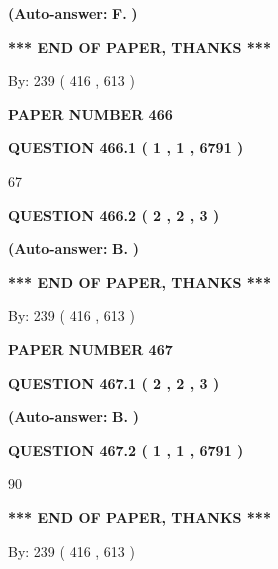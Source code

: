 \documentclass{ctexart}
\begin{document}
 
{\textbf{(Auto-answer:}}
{\textbf{\large{
F.}}}
{\textbf{)}}
 
 
   
   
   
   
\vspace{1.0in} 
{\textbf{\large{ *** END OF PAPER, THANKS *** }}} 
   
   
\hspace{1.0in} By: 
 239 ( 416 ,  613 )
   
   
   
   
\newpage 
\setcounter{page}{ 
   466001 } 
   
   
 {\textbf{ \Large{ PAPER NUMBER  466  }}}
   
   
   
   
  
  
{\textbf{\large{QUESTION
466.1 
 ( 1 , 1 , 6791 )
}}}

67
  
  
{\textbf{\large{QUESTION
466.2 
 ( 2 , 2 , 3 )
}}}
 
 
{\textbf{(Auto-answer:}}
{\textbf{\large{
B.}}}
{\textbf{)}}
 
 
   
   
   
   
\vspace{1.0in} 
{\textbf{\large{ *** END OF PAPER, THANKS *** }}} 
   
   
\hspace{1.0in} By: 
 239 ( 416 ,  613 )
   
   
   
   
\newpage 
\setcounter{page}{ 
   467001 } 
   
   
 {\textbf{ \Large{ PAPER NUMBER  467  }}}
   
   
   
   
  
  
{\textbf{\large{QUESTION
467.1 
 ( 2 , 2 , 3 )
}}}
 
 
{\textbf{(Auto-answer:}}
{\textbf{\large{
B.}}}
{\textbf{)}}
 
 
  
  
{\textbf{\large{QUESTION
467.2 
 ( 1 , 1 , 6791 )
}}}

90
   
   
   
   
\vspace{1.0in} 
{\textbf{\large{ *** END OF PAPER, THANKS *** }}} 
   
   
\hspace{1.0in} By: 
 239 ( 416 ,  613 )
   
   
   
\end{document}
